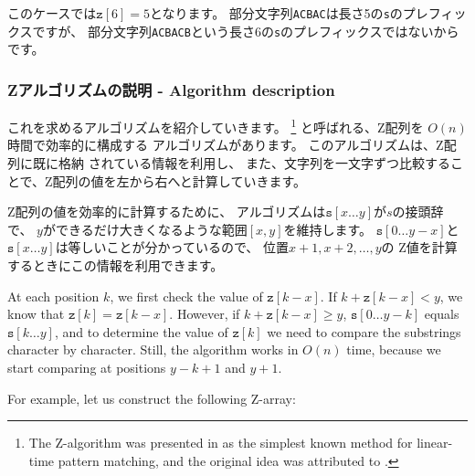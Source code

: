 このケースでは$\texttt{z}[6]=5$となります。
部分文字列\texttt{ACBAC}は長さ5の\texttt{s}のプレフィックスですが、
部分文字列\texttt{ACBACB}という長さ6の\texttt{s}のプレフィックスではないからです。

\subsubsection*{Zアルゴリズムの説明 - Algorithm description}

これを求めるアルゴリズムを紹介していきます。
\footnote{The Z-algorithm
was presented in \cite{gus97} as the simplest known
method for linear-time pattern matching, and the original idea
was attributed to \cite{mai84}.}
と呼ばれる、Z配列を $O(n)$ 時間で効率的に構成する アルゴリズムがあります。
このアルゴリズムは、Z配列に既に格納 されている情報を利用し、
また、文字列を一文字ずつ比較することで、Z配列の値を左から右へと計算していきます。

Z配列の値を効率的に計算するために、
アルゴリズムは$\texttt{s}[x \ldots y]$が$s$の接頭辞で、
$y$ができるだけ大きくなるような範囲$[x, y]$を維持します。
$\texttt{s}[0 \ldots y-x]$と$\texttt{s}[x \ldots y]$は等しいことが分かっているので、
位置$x+1,x+2,\ldots,y$の Z値を計算するときにこの情報を利用できます。

At each position $k$, we first
check the value of $\texttt{z}[k-x]$.
If $k+\texttt{z}[k-x]<y$, we know that $\texttt{z}[k]=\texttt{z}[k-x]$.
However, if $k+\texttt{z}[k-x] \ge y$,
$\texttt{s}[0 \ldots y-k]$ equals
$\texttt{s}[k \ldots y]$, and to determine the
value of $\texttt{z}[k]$ we need to compare
the substrings character by character.
Still, the algorithm works in $O(n)$ time,
because we start comparing at positions
$y-k+1$ and $y+1$.

For example, let us construct the following Z-array:

